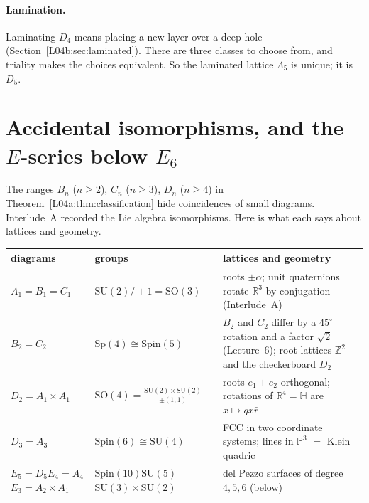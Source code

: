 \documentclass[11pt,openany]{book}
\theoremstyle{plain}
\theoremstyle{definition}
\theoremstyle{remark}
\newcommand{\R}{\mathbb{R}}
\newcommand{\Z}{\mathbb{Z}}
\newcommand{\SO}{\mathrm{SO}}
\begin{document}
\paragraph{Lamination.} Laminating $D_4$ means placing a new layer over a deep hole
(Section~\ref{L04b:sec:laminated}). There are three classes to choose from, and triality makes the choices
equivalent. So the laminated lattice $\Lambda_5$ is unique; it is $D_5$.

\section[Accidental isomorphisms and the $E$-series]{Accidental isomorphisms, and the \texorpdfstring{$E$}{E}-series below \texorpdfstring{$E_6$}{E6}}
\label{DYN:sec:accidents}

The ranges $B_n$ ($n\ge2$), $C_n$ ($n\ge3$), $D_n$ ($n\ge4$) in Theorem~\ref{L04a:thm:classification} hide
coincidences of small diagrams. Interlude~A recorded the Lie algebra isomorphisms. Here is what each says
about lattices and geometry.
\begin{center}
\renewcommand{\arraystretch}{1.25}
\small
\begin{tabular}{p{}p{}p{}}
\toprule
diagrams & groups & lattices and geometry\\
\midrule
$A_1=B_1=C_1$ & $\mathrm{SU}(2)/\pm1=\SO(3)$ & roots $\pm\alpha$; unit quaternions rotate $\R^3$ by conjugation (Interlude~A)\\
$B_2=C_2$ & $\mathrm{Sp}(4)\cong\mathrm{Spin}(5)$ & $B_2$ and $C_2$ differ by a $45^\circ$ rotation and a factor $\sqrt2$ (Lecture~6); root lattices $\Z^2$ and the checkerboard $D_2$\\
$D_2=A_1\times A_1$ & $\SO(4)=\frac{\mathrm{SU}(2)\times\mathrm{SU}(2)}{\pm(1,1)}$ & roots $e_1\pm e_2$ orthogonal; rotations of $\R^4=\mathbb H$ are $x\mapsto qx\bar r$\\
$D_3=A_3$ & $\mathrm{Spin}(6)\cong\mathrm{SU}(4)$ & FCC in two coordinate systems; lines in $\mathbb P^3$ $=$ Klein quadric\\
$E_5=D_5$\newline $E_4=A_4$\newline $E_3=A_2\times A_1$ & $\mathrm{Spin}(10)$\newline $\mathrm{SU}(5)$\newline $\mathrm{SU}(3)\times\mathrm{SU}(2)$ & del Pezzo surfaces of degree $4,5,6$ (below)\\
\bottomrule
\end{tabular}
\end{center}
\end{document}
